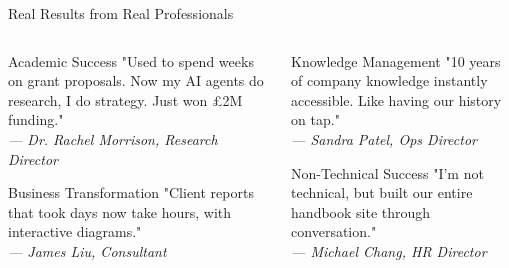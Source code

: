 \documentclass{beamer}
\begin{document}
\begin{frame}{Real Results from Real Professionals}
\begin{columns}[T]
\begin{column}{0.5\textwidth}
\begin{block}{Academic Success}
\small{"Used to spend weeks on grant proposals. Now my AI agents do research, I do strategy. Just won £2M funding."\\
\textit{— Dr. Rachel Morrison, Research Director}}
\end{block}
\vspace{0.5em}
\begin{block}{Business Transformation}
\small{"Client reports that took days now take hours, with interactive diagrams."\\
\textit{— James Liu, Consultant}}
\end{block}
\end{column}
\begin{column}{0.5\textwidth}
\begin{block}{Knowledge Management}
\small{"10 years of company knowledge instantly accessible. Like having our history on tap."\\
\textit{— Sandra Patel, Ops Director}}
\end{block}
\vspace{0.5em}
\begin{block}{Non-Technical Success}
\small{"I'm not technical, but built our entire handbook site through conversation."\\
\textit{— Michael Chang, HR Director}}
\end{block}
\end{column}
\end{columns}
\end{frame}
\end{document}

